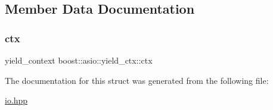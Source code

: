 \subsection{Member Data Documentation}
\mbox{\label{structboost_1_1asio_1_1yield__ctx_a7957d3a6e8bc2818d5548c549d2a7bc6}} 
\subsubsection{\texorpdfstring{ctx}{ctx}}
{\footnotesize\ttfamily yield\+\_\+context boost\+::asio\+::yield\+\_\+ctx\+::ctx}



The documentation for this struct was generated from the following file\+:\begin{DoxyCompactItemize}
\item 
\hyperlink{io_8hpp}{io.\+hpp}\end{DoxyCompactItemize}

